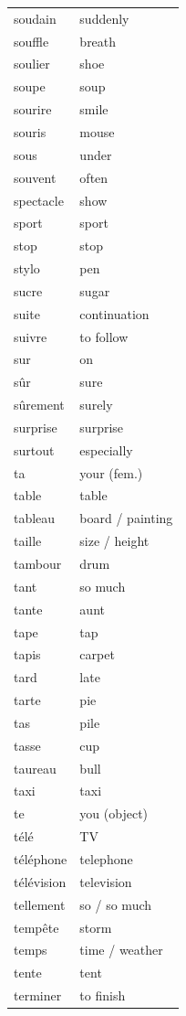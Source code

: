 \documentclass[12pt,a4paper]{article}
\begin{document}
\begin{longtable}{p{4cm} p{6cm}}
soudain & suddenly \\
souffle & breath \\
soulier & shoe \\
soupe & soup \\
sourire & smile \\
souris & mouse \\
sous & under \\
souvent & often \\
spectacle & show \\
sport & sport \\
stop & stop \\
stylo & pen \\
sucre & sugar \\
suite & continuation \\
suivre & to follow \\
sur & on \\
sûr & sure \\
sûrement & surely \\
surprise & surprise \\
surtout & especially \\
ta & your (fem.) \\
table & table \\
tableau & board / painting \\
taille & size / height \\
tambour & drum \\
tant & so much \\
tante & aunt \\
tape & tap \\
tapis & carpet \\
tard & late \\
tarte & pie \\
tas & pile \\
tasse & cup \\
taureau & bull \\
taxi & taxi \\
te & you (object) \\
télé & TV \\
téléphone & telephone \\
télévision & television \\
tellement & so / so much \\
tempête & storm \\
temps & time / weather \\
tente & tent \\
terminer & to finish \\

\end{longtable}
\end{document}

